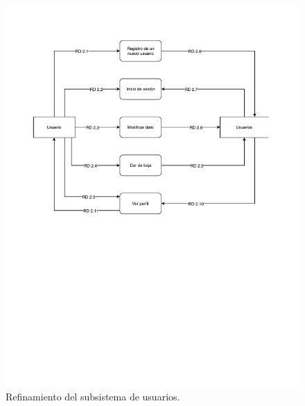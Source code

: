 \begin{figure}[H]
  \caption{Refinamiento del subsistema de usuarios.}
  \centering
  \includegraphics[scale=0.9]{diagramas/ref-usuario.pdf}
\end{figure}

